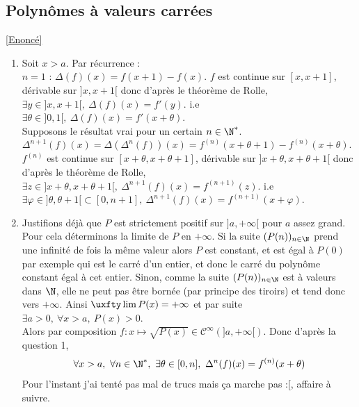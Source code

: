 \documentclass{book}
\begin{document}
	\subsection{Polynômes à valeurs carrées}
	\label{sec:polynomes-à-valeurs-carrées}
	\textcolor{blue}{\hyperref[Polynômes à valeurs carrées]{[Enoncé]}}\\
	\begin{enumerate}[leftmargin=*]
		\item Soit $x>a$. Par récurrence :\\
		$n=1$ : $\Delta(f)(x)=f(x+1)-f(x)$. $f$ est continue sur $[x,x+1]$, dérivable sur $]x,x+1[$ donc d'après le théorème de Rolle, $\exists y\in ]x,x+1[,\ \Delta(f)(x)=f'(y)$. i.e $\exists \theta\in ]0,1[,\ \Delta(f)(x)=f'(x+\theta)$.\\
		Supposons le résultat vrai pour un certain $n\in \N^*$.\\
		$\Delta^{n+1}(f)(x)=\Delta(\Delta^n(f))(x)=f^{(n)}(x+\theta+1)-f^{(n)}(x+\theta)$.\\
		$f^{(n)}$ est continue sur $[x+\theta,x+\theta+1]$, dérivable sur $]x+\theta,x+\theta+1[$ donc d'après le théorème de Rolle, $\exists z\in ]x+\theta,x+\theta+1[,\ \Delta^{n+1}(f)(x)=f^{(n+1)}(z)$. i.e $\exists\varphi\in ]\theta,\theta+1[\subset[0,n+1],\ \Delta^{n+1}(f)(x)=f^{(n+1)}(x+\varphi)$.
		\item Justifions déjà que $P$ est strictement positif sur $]a,+\infty[$ pour $a$ assez grand. Pour cela déterminons la limite de $P$ en $+\infty$. Si la suite $(P(n))_{n\in \N}$ prend une infinité de fois la même valeur alors $P$ est constant, et est égal à $P(0)$ par exemple qui est le carré d'un entier, et donc le carré du polynôme constant égal à cet entier. Sinon, comme la suite $(P(n))_{n\in \N}$ est à valeurs dans $\N$, elle ne peut pas être bornée (par principe des tiroirs) et tend donc vers $+\infty$. Ainsi $\uxfty\lim P(x)=+\infty$ et par suite $\exists a>0,\ \forall x>a,\ P(x)>0$.\\
		Alors par composition $f:x\mapsto \sqrt{P(x)}\in \mathcal C^\infty(]a,+\infty[)$. Donc d'après la question 1,\\
		$$\forall x>a,\ \forall n\in \N^*,\ \exists \theta\in [0,n],\ \Delta^n(f)(x)=f^{(n)}(x+\theta)$$
		Pour l'instant j'ai tenté pas mal de trucs mais ça marche pas :[, affaire à suivre.
	\end{enumerate}
	
\end{document}

